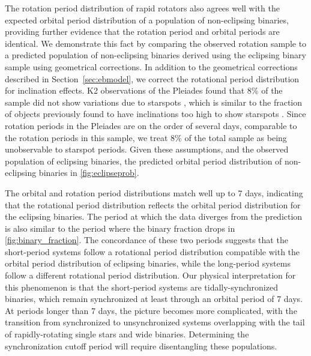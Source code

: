 \documentclass[twocolumn]{aastex6}
\begin{document}
The rotation period distribution of rapid rotators also agrees well with the 
expected orbital period distribution of a population of non-eclipsing
binaries, providing further evidence that the rotation period and orbital
periods are identical. We demonstrate this fact by comparing the observed
rotation sample to a predicted population of non-eclipsing binaries derived
using the eclipsing binary sample using geometrical corrections.
In addition to the geometrical
corrections described in Section~\ref{sec:ebmodel}, we correct the rotational 
period distribution for inclination effects. K2 observations of the Pleiades 
found that 8\% of the sample did not show variations due to starspots 
\citep{Rebull17}, which is similar to the fraction of objects previously found 
to have inclinations too high to show starspots \citep{Jackson10}. Since 
rotation periods in the Pleiades are on the order of several days, comparable to 
the rotation periods in this sample, we treat 8\% of the total sample as being 
unobservable to starspot periods. Given these assumptions, and the observed 
population of eclipsing binaries, the predicted orbital period distribution of 
non-eclipsing binaries in \cref{fig:eclipseprob}. 

The orbital and rotation period distributions match well up to 7 days, indicating
that the rotational period distribution reflects the orbital period
distribution for the eclipsing binaries. The period at which the data diverges
from the prediction is also similar to the period where the binary fraction 
drops in \cref{fig:binary_fraction}. The concordance of these two periods 
suggests that the short-period systems follow a rotational period distribution 
compatible with the orbital period distribution of eclipsing binaries, while 
the long-period systems follow a different rotational
period distribution. Our physical interpretation for this phenomenon is that 
the short-period systems are tidally-synchronized binaries, which remain 
synchronized at least through an orbital period of 7 days. At periods longer
than 7 days, the picture becomes more complicated, with the transition from
synchronized to unsynchronized systems overlapping with the tail of
rapidly-rotating single stars and wide binaries. Determining the
synchronization cutoff period will require disentangling these populations.
\end{document}
